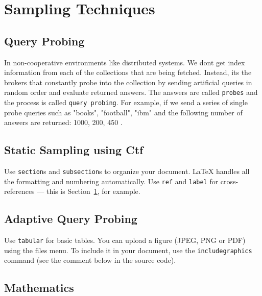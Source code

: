 \documentclass[paper=a4, fontsize=11pt,twoside]{scrartcl}	%
\begin{document}
\section{Sampling Techniques}
\label{sec:examples}




\subsection{Query Probing}
In non-cooperative environments like distributed systems. We dont get index information from each of the collections that are being fetched. Instead, its the brokers that constantly probe into the collection by sending artificial queries in random order and evaluate returned answers. The answers are called \texttt{probes} 
and the process is called \texttt{query probing}. For example, if we send a series of single probe queries such as "books", "football", "ibm" and the following number of answers are returned: 1000, 200, 450 .


\subsection{Static Sampling using Ctf}

Use \texttt{section}s and \texttt{subsection}s to organize your document. \LaTeX{} handles all the formatting and numbering automatically. Use \texttt{ref} and \texttt{label} for cross-references --- this is Section~\ref{sec:examples}, for example.



\subsection{Adaptive Query Probing}

Use \texttt{tabular} for basic tables. You can upload a figure (JPEG, PNG or PDF) using the files menu. To include it in your document, use the \texttt{includegraphics} command (see the comment below in the source code).


\subsection{Mathematics}
\end{document}
